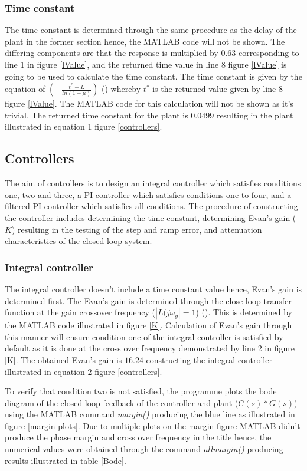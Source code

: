 \documentclass[
	12pt, %
]{fphw}
\begin{document}
\subsubsection{Time constant}
The time constant is determined through the same procedure as the delay of the plant in the former section hence, the MATLAB code will not be shown. The differing components are that the response is multiplied by $0.63$ corresponding to line 1 in figure \ref{lValue}, and the returned time value in line 8 figure \ref{lValue} is going to be used to calculate the time constant. The time constant is given by the equation of $(-\frac{t^{*} - L}{ln(1 - \mu)})$ (\cite{lec4_higher_order}) whereby $t^{*}$ is the returned value given by line 8 figure \ref{lValue}. The MATLAB code for this calculation will not be shown as it's trivial. The returned time constant for the plant is $0.0499$ resulting in the plant illustrated in equation 1  figure \ref{controllers}.

 \subsection{Controllers}
 The aim of controllers is to design an integral controller which satisfies conditions one, two and three, a PI controller which satisfies conditions one to four, and a filtered PI controller which satisfies all conditions. The procedure of constructing the controller includes determining the time constant, determining Evan's gain ($K$) resulting in the testing of the step and ramp error, and attenuation characteristics of the closed-loop system.\par

\subsubsection{Integral controller}
The integral controller doesn't include a time constant value hence, Evan's gain is determined first. The Evan's gain is determined through the close loop transfer function at the gain crossover frequency ($|L(j \omega_{g}| = 1$) (\cite{gain_crossover}). This is determined by the MATLAB code illustrated in figure \ref{K}. Calculation of Evan's gain through this manner will ensure condition one of the integral controller is satisfied by default as it is done at the cross over frequency demonstrated by line 2 in figure \ref{K}. The obtained Evan's gain is $16.24$ constructing the integral controller illustrated in equation 2 figure \ref{controllers}.\par
To verify that condition two is not satisfied, the programme plots the bode diagram of the closed-loop feedback of the controller and plant ($C(s) * G(s)$) using the MATLAB command \emph{margin()} producing the blue line as illustrated in figure \ref{margin plots}. Due to multiple plots on the margin figure MATLAB didn't produce the phase margin and cross over frequency in the title hence, the numerical values were obtained through the command \emph{allmargin()} producing results illustrated in table \ref{Bode}.
\end{document}
